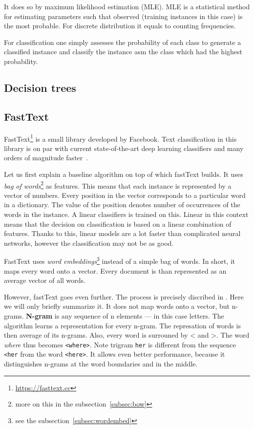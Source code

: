 It  does so by maximum likelihood estimation (MLE).
MLE is a statistical method for estimating parameters such that observed (training instances in this case) is the most probable. For discrete distribution it equals to counting frequencies.
 
For classification one simply assesses the probability of each class to generate a classified instance and classify the instance asm the class which had the highest probability.

\subsection{Decision trees}
\label{subsec:decisiontree}

\subsection{FastText}

FastText\footnote{\url{https://fasttext.cc}} is a small library developed by Facebook.
Text classification in this library is on par with current state-of-the-art deep learning classifiers
and many orders of magnitude faster~\citep{Joulin2017bag}.

Let us first explain a baseline algorithm on top of which fastText builds.
It uses {\it bag of words}\footnote{more on this in the subsection~\ref{subsec:bow}} as features.
This means that each instance is represented by a vector of numbers.
Every position in the vector corresponds to a particular word in a dictionary.
The value of the position denotes number of occurrences of the words in the instance.
A linear classifiers is trained on this.
Linear in this context means that the decision on classification is based on a linear combination of features.
Thanks to this, linear models are a lot faster than complicated neural networks, however the classification may not be as good.

FastText uses {\it word embeddings}\footnote{see the subsection~\ref{subsec:wordembed}} instead of a simple bag of words.
In short, it maps every word onto a vector. Every document is than represented as an average vector of all words.

However, fastText goes even further.
The process is precisely discribed in \citet{Bojanowski2017enriching}.
Here we will only briefly summarize it.
It does not map words onto a vector, but n-grams.
{\bf N-gram} is any sequence of n elements --- in this case letters.
The algorithm learns a representation for every n-gram.
The represation of words is then average of its n-grams.
Also, every word is surrouned by < and >.
The word {\it where} thus becomes {\tt <where>}.
Note trigram {\tt her} is different from the sequence {\tt <her} from the word {\tt <here>}.
It allows even better performance, because it distinguishes n-grams at the word boundaries and in the middle.

